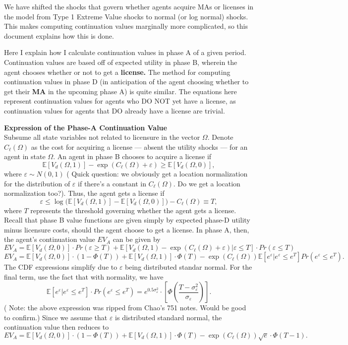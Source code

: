 \documentclass[12pt]{article}
\newcommand{\noi}{\bigskip \noindent}
\newcommand{\Ex}{\mathds{E}}
\begin{document}
We have shifted the shocks that govern whether agents acquire MAs or licenses in the model from Type 1 Extreme Value shocks to normal (or log normal) shocks. This makes computing continuation values marginally more complicated, so this document explains how this is done.

Here I explain how I calculate continuation values in phase A of a given period. Continuation values are based off of expected utility in phase B, wherein the agent chooses whether or not to get a \textbf{license.} The method for computing continuation values in phase D (in anticipation of the agent choosing whether to get their \textbf{MA} in the upcoming phase A) is quite similar. The equations here represent continuation values for agents who DO NOT yet have a license, as continuation values for agents that DO already have a license are trivial.


\noi \textbf{Expression of the Phase-A Continuation Value}\\
Subsume all state variables not related to licensure in the vector $\Omega$. Denote $C_\ell(\Omega)$ as the cost for acquiring a license ---  absent the utility shocks --- for an agent in state $\Omega$. An agent in phase B chooses to acquire a license if
$$\Ex[V_d(\Omega, 1)] - \exp(C_\ell(\Omega) + \varepsilon) \geq \Ex[V_d(\Omega, 0)],$$ 
where $\varepsilon \sim N(0, 1)$ ({\color{blue} Quick question: we obviously get a location normalization for the distribution of $\varepsilon$ if there's a constant in $C_\ell(\Omega)$. Do we get a location normalization too?}). Thus, the agent gets a license if
$$\varepsilon \leq \log \big(\Ex[V_d(\Omega, 1)] - \Ex[V_d(\Omega, 0)]\big) - C_\ell(\Omega)\equiv T,$$
where $T$ represents the threshold governing whether the agent gets a license. Recall that phase B value functions are given simply by expected phase-D utility minus licensure costs, should the agent choose to get a license. In phase A, then, the agent's continuation value $EV_A$ can be given by
$$EV_A = \Ex[V_d(\Omega, 0)] \cdot Pr(\varepsilon\geq T) + \Ex[V_d(\Omega, 1) - \exp(C_\ell(\Omega) + \varepsilon) | \varepsilon\leq T]\cdot Pr(\varepsilon\leq T)$$
$$EV_A = \Ex[V_d(\Omega, 0)] \cdot \left(1-\Phi(T)\right) + \Ex[V_d(\Omega, 1)] \cdot \Phi(T) - \exp(C_\ell(\Omega))\Ex[e^\varepsilon|e^\varepsilon\leq e^T]Pr(e^\varepsilon\leq e^T).$$
The CDF expressions simplify due to $\varepsilon$ being distributed standar normal. For the final term, use the fact that with normality, we have
$$\Ex[e^\varepsilon | e^\varepsilon\leq e^T] \cdot Pr(e^\varepsilon \leq e^T) = e^{0.5\sigma^2_\varepsilon} \cdot \left[\Phi\left(\frac{T - \sigma^2_\varepsilon}{\sigma_\varepsilon}\right)\right].$$
({\color{blue} Note: the above expression was ripped from Chao's 751 notes. Would be good to confirm.}) Since we assume that $\varepsilon$ is distributed standard normal, the continuation value then reduces to
$$EV_A = \Ex[V_d(\Omega, 0)] \cdot \left(1-\Phi(T)\right) + \Ex[V_d(\Omega, 1)] \cdot \Phi(T) - \exp(C_\ell(\Omega))\sqrt{e} \cdot \Phi(T - 1).$$
\end{document}
